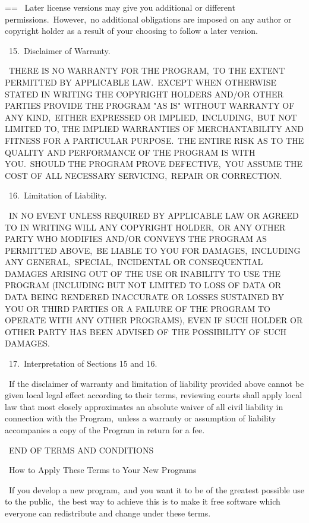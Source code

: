 \documentclass{book}
\makeatletter
\newenvironment{Texinfopreformatted}{%
  \par\GNUTobeylines\obeyspaces\frenchspacing\parskip=\z@\parindent=\z@}{}
{\catcode`\^^M=13 \gdef\GNUTobeylines{\catcode`\^^M=13 \def^^M{\null\par}}}
\newenvironment{Texinfoindented}{\begin{list}{}{}\item\relax}{\end{list}}
\renewcommand{\_}{\Texinfounderscore\discretionary{}{}{}}
\makeatother
\begin{document}
\begin{Texinfoindented}
\begin{Texinfopreformatted}
\  Later license versions may give you additional or different
permissions.\  However,\ no additional obligations are imposed on any
author or copyright holder as a result of your choosing to follow a
later version.

\  15.\ Disclaimer of Warranty.

\  THERE IS NO WARRANTY FOR THE PROGRAM,\ TO THE EXTENT PERMITTED BY
APPLICABLE LAW.\  EXCEPT WHEN OTHERWISE STATED IN WRITING THE COPYRIGHT
HOLDERS AND/OR OTHER PARTIES PROVIDE THE PROGRAM "AS IS" WITHOUT WARRANTY
OF ANY KIND,\ EITHER EXPRESSED OR IMPLIED,\ INCLUDING,\ BUT NOT LIMITED TO,
THE IMPLIED WARRANTIES OF MERCHANTABILITY AND FITNESS FOR A PARTICULAR
PURPOSE.\  THE ENTIRE RISK AS TO THE QUALITY AND PERFORMANCE OF THE PROGRAM
IS WITH YOU.\  SHOULD THE PROGRAM PROVE DEFECTIVE,\ YOU ASSUME THE COST OF
ALL NECESSARY SERVICING,\ REPAIR OR CORRECTION.

\  16.\ Limitation of Liability.

\  IN NO EVENT UNLESS REQUIRED BY APPLICABLE LAW OR AGREED TO IN WRITING
WILL ANY COPYRIGHT HOLDER,\ OR ANY OTHER PARTY WHO MODIFIES AND/OR CONVEYS
THE PROGRAM AS PERMITTED ABOVE,\ BE LIABLE TO YOU FOR DAMAGES,\ INCLUDING ANY
GENERAL,\ SPECIAL,\ INCIDENTAL OR CONSEQUENTIAL DAMAGES ARISING OUT OF THE
USE OR INABILITY TO USE THE PROGRAM (INCLUDING BUT NOT LIMITED TO LOSS OF
DATA OR DATA BEING RENDERED INACCURATE OR LOSSES SUSTAINED BY YOU OR THIRD
PARTIES OR A FAILURE OF THE PROGRAM TO OPERATE WITH ANY OTHER PROGRAMS),
EVEN IF SUCH HOLDER OR OTHER PARTY HAS BEEN ADVISED OF THE POSSIBILITY OF
SUCH DAMAGES.

\  17.\ Interpretation of Sections 15 and 16.

\  If the disclaimer of warranty and limitation of liability provided
above cannot be given local legal effect according to their terms,
reviewing courts shall apply local law that most closely approximates
an absolute waiver of all civil liability in connection with the
Program,\ unless a warranty or assumption of liability accompanies a
copy of the Program in return for a fee.

\                     END OF TERMS AND CONDITIONS

\            How to Apply These Terms to Your New Programs

\  If you develop a new program,\ and you want it to be of the greatest
possible use to the public,\ the best way to achieve this is to make it
free software which everyone can redistribute and change under these terms.


\end{Texinfopreformatted}
\end{Texinfoindented}
\end{document}
